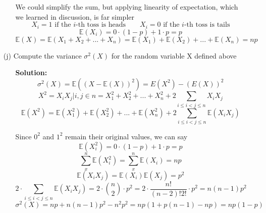 \documentclass[hidelinks]{article}
\begin{document}
\begin{itemize}
\begin{itemize}
    \item[ ] We could simplify the sum, but applying linearity of expectation, which we learned in discussion, is far simpler
    \[
        X_i = 1 \text{ if the $i$-th toss is heads} \quad \quad
        X_i = 0 \text{ if the $i$-th toss is tails} 
    \]
    \[
        \mathbb{E}(X_i) = 0\cdot(1 - p) + 1 \cdot p = p
    \]
    \[
        \mathbb{E}(X) = \mathbb{E}(X_1 + X_2 + ... + X_n) = \mathbb{E}(X_1) + \mathbb{E}(X_2) + ... + \mathbb{E}(X_n) = np
    \]
    \end{itemize}
    \item[(j)] Compute the variance $\sigma^2(X)$ for the random variable X defined above
   \begin{itemize}
       \item[ ] \textbf{Solution: }
        \[
            \sigma^2(X) = \mathbb{E}((X - \mathbb{E}(X))^2) 
            = E(X^2) - (E(X))^2
        \]
        \[
            X^2 = X_i X_j | i, j \in n = X_1^2 + X_2^2 + ... + X^2_n + 2 \sum_{i \leq i < j \leq n} X_iX_j
        \]
        \[
            \mathbb{E}(X^2) = \mathbb{E}(X_1^2) + \mathbb{E}(X_2^2) + ... + \mathbb{E}(X_n^2) + 2 \sum_{i \leq i < j \leq n} \mathbb{E}(X_iX_j)
        \]
    \item[ ] Since $0^2$ and $1^2$ remain their original values, we can say 
    \[
        \mathbb{E}(X_i^2) = 0\cdot(1 - p) + 1 \cdot p = p
    \]
    \[
        \sum_x^n \mathbb{E}(X_i^2) = \sum_x^n \mathbb{E}(X_i)= np
    \]
    \[
        \mathbb{E}(X_iX_j) = \mathbb{E}(X_i)\mathbb{E}(X_j) = p^2
    \]
    \[
        2 \cdot \sum_{i \leq i < j \leq n} \mathbb{E}(X_iX_j) = 2\cdot \binom{n}{2} \cdot p^2 = 2 \cdot \frac{n!}{(n-2)!2!} \cdot p^2 = n(n-1)p^2
    \]
    \[
        \sigma^2(X) =np + n(n -1)p^2 - n^2p^2 =  np(1 + p(n -1) - np) = np(1 - p)
    \]
    \end{itemize}
    \end{itemize}
\newpage 
\end{document}
